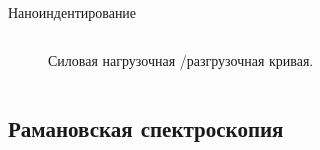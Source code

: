 \documentclass[aspectratio=169]{beamer}
\begin{document}
\begin{frame}{Наноиндентирование}
\begin{columns}
{\begin{figure}
            \caption*{Силовая нагрузочная /разгрузочная кривая.}
        \end{figure}
        }
    \end{columns}
\end{frame}


\subsection{Рамановская спектроскопия}
\end{document}
